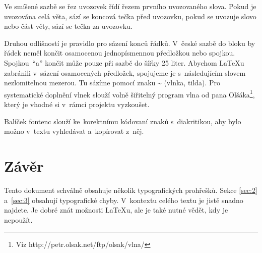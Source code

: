 \documentclass[10pt,twocolumn]{article}
\begin{document}
        Ve smíšené sazbě se řez uvozovek řídí řezem prvního uvozovaného slova.
        Pokud je uvozována celá věta, sází se koncová tečka před uvozovku, pokud se uvozuje slovo nebo část věty, sází se tečka za uvozovku.
        
        Druhou odlišností je pravidlo pro sázení konců řádků.
        V~české sazbě do bloku by řádek neměl končit osamocenou jednopísmennou předložkou nebo spojkou.
        Spojkou~\enquote{a} končit může pouze při sazbě do šířky 25 liter.
        Abychom \LaTeX{}u zabránili v~sázení osamocených předložek, spojujeme je s~následujícím slovem nezlomitelnou mezerou.
        Tu sázíme pomocí znaku \~{} (vlnka, tilda).
        Pro systematické doplnění vlnek slouží volně šiřitelný program vlna od pana Olšáka\footnote{Viz http://petr.olsak.net/ftp/olsak/vlna/}, který je vhodné si v~rámci projektu vyzkoušet.
        
        Balíček fontenc slouží ke~korektnímu kódovaní znaků s~diakritikou, aby bylo možno v~textu vyhledávat a~kopírovat z~něj.
    \section{Závěr}\label{sec:5}
        Tento dokument schválně obsahuje několik typografických prohřešků.
        Sekce \ref{sec:2} a~\ref{sec:3} obsahují typografické chyby.
        V~kontextu celého textu je jistě snadno najdete.
        Je dobré znát možnosti \LaTeX{}u, ale je také nutné vědět, kdy je nepoužít.
\end{document}
